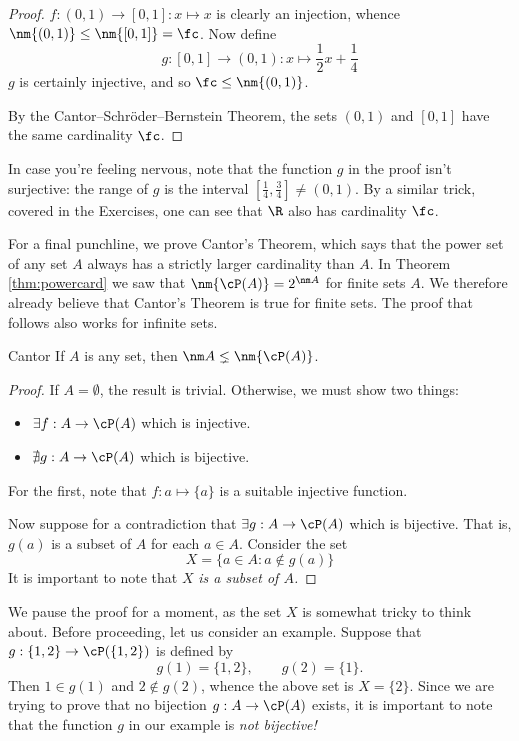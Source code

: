 \begin{proof}
	$f:(0,1)\to[0,1]:x\mapsto x$ is clearly an injection, whence $\nm{(0,1)}\le\nm{[0,1]}=\fc$. Now define
	\[
		g:[0,1]\to (0,1):x\mapsto \frac 12x+\frac 14
	\]
	$g$ is certainly injective, and so $\fc\le\nm{(0,1)}$.\par
	By the Cantor--Schr\"oder--Bernstein Theorem, the sets $(0,1)$ and $[0,1]$ have the same cardinality $\fc$.
\end{proof}

In case you're feeling nervous, note that the function $g$ in the proof isn't surjective: the range of $g$ is the interval $[\frac 14,\frac 34]\neq (0,1)$. By a similar trick, covered in the Exercises, one can see that $\R$ also has cardinality $\fc$.\par

For a final punchline, we prove Cantor's Theorem, which says that the power set of any set $A$ always has a strictly larger cardinality than $A$. In Theorem \ref{thm:powercard} we saw that $\nm{\cP(A)}=2^{\nm A}$ for finite sets $A$. We therefore already believe that Cantor's Theorem is true for finite sets. The proof that follows also works for infinite sets.

\begin{thm}{Cantor}{}
	If $A$ is any set, then $\nm A\lneq\nm{\cP(A)}$.
\end{thm}

\begin{proof}
	If $A=\emptyset$, the result is trivial. Otherwise, we must show two things:
	\begin{itemize}
	  \item $\exists f:A\to\cP(A)$ which is injective.
	  \item $\nexists g:A\to\cP(A)$ which is bijective.
	\end{itemize}
	For the first, note that $f:a\mapsto\{a\}$ is a suitable injective function.\par
	Now suppose for a contradiction that $\exists g:A\to\cP(A)$ which is bijective. That is, $g(a)$ is a subset of $A$ for each $a\in A$. Consider the set
	  \[
	  	X=\{a\in A:a\not\in g(a)\}
	  \]
	  It is important to note that $X$ \emph{is a subset of $A$.}\phantom\qedhere
\end{proof}
  
We pause the proof for a moment, as the set $X$ is somewhat tricky to think about. Before proceeding, let us consider an example. Suppose that $g:\{1,2\}\to\cP(\{1,2\})$ is defined by
  \[g(1)=\{1,2\},\qquad g(2)=\{1\}.\]
  Then $1\in g(1)$ and $2\not\in g(2)$, whence the above set is $X=\{2\}$. Since we are trying to prove that no bijection $g:A\to\cP(A)$ exists, it is important to note that the function $g$ in our example is \emph{not bijective!}

